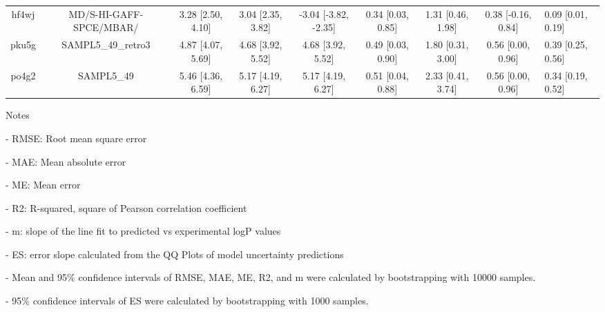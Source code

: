 \documentclass{article}
\begin{document}
\begin{center}
\begin{longtable}{|cccccccc|}
 hf4wj &                            MD/S-HI-GAFF-SPCE/MBAR/ &  3.28 [2.50, 4.10] &  3.04 [2.35, 3.82] &  -3.04 [-3.82, -2.35] &  0.34 [0.03, 0.85] &    1.31 [0.46, 1.98] &   0.38 [-0.16, 0.84] &     0.09 [0.01, 0.19] \\
 pku5g &                                 SAMPL5\_49\_retro3 &  4.87 [4.07, 5.69] &  4.68 [3.92, 5.52] &     4.68 [3.92, 5.52] &  0.49 [0.03, 0.90] &    1.80 [0.31, 3.00] &    0.56 [0.00, 0.96] &     0.39 [0.25, 0.56] \\
 po4g2 &                                         SAMPL5\_49 &  5.46 [4.36, 6.59] &  5.17 [4.19, 6.27] &     5.17 [4.19, 6.27] &  0.51 [0.04, 0.88] &    2.33 [0.41, 3.74] &    0.56 [0.00, 0.96] &     0.34 [0.19, 0.52] \\
\end{longtable}
\end{center}

Notes

- RMSE: Root mean square error

- MAE: Mean absolute error

- ME: Mean error

- R2: R-squared, square of Pearson correlation coefficient

- m: slope of the line fit to predicted vs experimental logP values

- ES: error slope calculated from the QQ Plots of model uncertainty predictions

- Mean and 95\% confidence intervals of RMSE, MAE, ME, R2, and m were calculated by bootstrapping with 10000 samples.

- 95\% confidence intervals of ES were calculated by bootstrapping with 1000 samples.\end{document}
\end{document}
